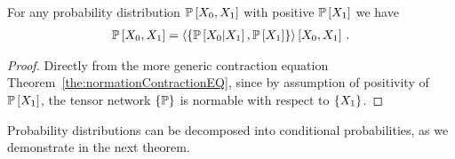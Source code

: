 \begin{theorem}\label{the:bayes}
	For any probability distribution $\mathbb{P}\left[X_{0}, X_{1}\right]$ with positive $\mathbb{P}\left[X_{1}\right]$ we have
	\begin{align*}
		\mathbb{P}\left[X_{0}, X_{1}\right] = \left\langle \{ \mathbb{P}\left[X_{0}|X_{1}\right], \mathbb{P}\left[X_{1}\right] \}\right\rangle \left[ X_{0}, X_{1} \right] \, . 
	\end{align*}
\end{theorem}
\begin{proof}
	Directly from the more generic contraction equation Theorem~\ref{the:normationContractionEQ}, since by assumption of positivity of $\mathbb{P}\left[X_{1}\right]$, the tensor network $\{\mathbb{P}\}$ is normable with respect to $\{X_{1}\}$.
\end{proof}


Probability distributions can be decomposed into conditional probabilities, as we demonstrate in the next theorem.

